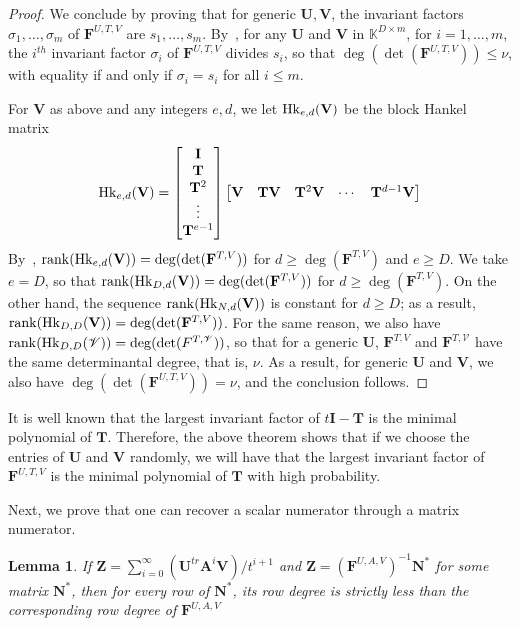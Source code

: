 \documentclass[12pt]{article}
\newtheorem{Lemma}{Lemma}
\def\K {\ensuremath{\mathbb{K}}}
\def\scrV {\ensuremath{\mathscr{V}}}
\def\K{\mathbb{K}}
\def\mA{\mathbf{A}}
\def\mF{\mathbf{F}}
\def\mI{\mathbf{I}}
\def\mN{\mathbf{N}}
\def\mT{\mathbf{T}}
\def\mU{\mathbf{U}}
\def\mV{\mathbf{V}}
\def\mZ{\mathbf{Z}}
\begin{document}
\begin{proof}
	We conclude by proving that for generic $\mU,\mV$, the invariant factors
	$\sigma_1,\dots,\sigma_m$ of $\mF^{U,T,V}$ are $s_1,\dots,s_m$.
	By~\cite[Theorem~2.12]{KaVi04}, for any $\mU$ and $\mV$ in $\K^{D\times
		m}$, for $i=1,\dots,m$, the $i^{th}$ invariant factor $\sigma_i$ of
	$\mF^{U,T,V}$ divides $s_i$, so that $\deg(\det(\mF^{U,T,V}))\le\nu$, with
	equality if and only if $\sigma_i=s_i$ for all $i \le m$.
	
	For $\mV$ as above and any integers $e,d$, we let ${\rm Hk}_{e,d}(\mV)$ be
	the block Hankel matrix
	$$ {\rm Hk}_{e,d}(\mV) =
	\begin{bmatrix}
	\mI \\  \mT \\  \mT^2 \\ \vdots  \\  \mT^{e-1}
	\end{bmatrix}
	\begin{bmatrix}
	\mV & \mT\mV & \mT^2\mV &\cdots&  \mT^{d-1}\mV
	\end{bmatrix}
	$$ By~\cite[Eq.~(2.6)]{KaVi04}, ${\rm rank}({\rm Hk}_{e,d}(\mV)) =
	\deg(\det(\mF^{T,V}))$ for $d \ge \deg(\mF^{T,V})$ and $e \ge D$.  We take
	$e=D$, so that ${\rm rank}({\rm Hk}_{D,d}(\mV)) = \deg(\det(\mF^{T,V}))$
	for $d \ge \deg(\mF^{T,V})$. On the other hand, the sequence ${\rm
		rank}({\rm Hk}_{N,d}(\mV))$ is constant for $d \ge D$; as a result,
	${\rm rank}({\rm Hk}_{D,D}(\mV)) = \deg(\det(\mF^{T,V}))$. For the same
	reason, we also have ${\rm rank}({\rm Hk}_{D,D}(\scrV)) =
	\deg(\det(F^{T,\scrV}))$, so that for a generic $\mU$, $\mF^{T,V}$ and
	$\mF^{T,\scrV}$ have the same determinantal degree, that is, $\nu$.  As
	a result, for generic $\mU$ and $\mV$, we also have
	$\deg(\det(\mF^{U,T,V}))=\nu$, and the conclusion follows.
\end{proof} 

It is well known that the largest invariant factor of
$t\mI - \mT$ is the minimal polynomial of $\mT$. Therefore, the above
theorem shows that if we choose the entries of $\mU$ and $\mV$
randomly, we will have that the
largest invariant factor of $\mF^{U,T,V}$ is the minimal
polynomial of $\mT$  with high probability.

Next, we prove that one can recover a scalar numerator
through a matrix numerator.

\begin{Lemma}\label{num_deg}
	If $\mZ = 
	\sum_{i=0}^{\infty} (\mU^{tr} \mA^i \mV)/ t^{i+1}$ and
	$\mZ = (\mF^{U,A,V})^{-1}\mN^*$ for some matrix $\mN^*$,
	then for every row of $\mN^*$, 
	its row degree is strictly
	less than the corresponding row degree of $\mF^{U,A,V}$
\end{Lemma}
\end{document}
